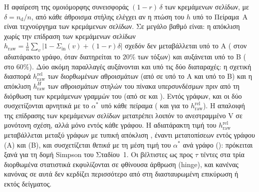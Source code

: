 \documentclass[11pt,a4paper]{article}
\theoremstyle{definition}
\theoremstyle{remark}
\newcommand{\Sin}{\Sigma_{\mathrm{in}}}
\begin{document}
Η αφαίρεση της ομοιόμορφης συνεισφοράς $(1-r)\,\delta$ των κρεμάμενων σελίδων, με
$\delta=n_{\mathrm d}/n$, από κάθε άθροισμα στήλης ελέγχει αν η πτώση του $h$ υπό το Πείραμα~Α είναι τεχνούργημα των
κρεμάμενων σελίδων. Σε μεγάλο βαθμό είναι: η απόκλιση χωρίς την επίδραση των κρεμάμενων σελίδων
$h_{\mathrm{raw}}=\frac1n\sum_v|1-\Sin(v)+(1-r)\delta|$ σχεδόν δεν μεταβάλλεται υπό το Α (\NmHrawFull{}
στον αδιατάρακτο γράφο, \NmHrawSevA{} όταν διατηρείται το $20\%$ των τόξων) και αυξάνεται υπό το Β
(\NmHrawSevB{} στο $60\%$). Δύο ακόμη παραλλαγές αυξάνονται και υπό τις δύο διαταραχές: η σχετική
διασπορά $h_{\mathrm{raw}}^{\mathrm{rel}}$ των διορθωμένων αθροισμάτων (από \NmHrelFull{} σε
\NmHrelSevA{} υπό το Α και \NmHrelSevB{} υπό το Β) και η απόκλιση $h_{\mathrm{raw}}^{H}$ των αθροισμάτων
στηλών του πίνακα υπερσυνδέσμων πριν από τη διόρθωση των κρεμάμενων γραμμών του (από \NmHHFull{} σε
\NmHHSevA{} και \NmHHSevB). Εντός γράφων, και οι δύο συσχετίζονται αρνητικά με το $\alpha^*$ υπό κάθε
πείραμα (\NmHrelAstarA{} και \NmHrelAstarB{} για το $h_{\mathrm{raw}}^{\mathrm{rel}}$). Η απαλοιφή της
επίδρασης των κρεμάμενων σελίδων μετατρέπει λοιπόν το ανεστραμμένο V σε μονότονη σχέση, αλλά μόνο εντός
κάθε γράφου. Η αδιατάρακτη τιμή του $h_{\mathrm{raw}}^{\mathrm{rel}}$ μεταβάλλεται μεταξύ γράφων με
τυπική απόκλιση \NmRelSd, έναντι μετατοπίσεων εντός γράφου \NmRelExcA{} (Α) και \NmRelExcB{} (Β), και
συσχετίζεται \emph{θετικά} με τη μέση τιμή του $\alpha^*$ ανά γράφο (\NmRelBetween): πρόκειται ξανά για
τη δομή Simpson του Σταδίου~1. Οι βέλτιστες ως προς $\tau$ τέντες στα τρία διορθωμένα στατιστικά
εκφυλίζονται σε φθίνουσα άρθρωση (hinge), και κανένας κανόνας σε αυτά δεν κερδίζει περισσότερο από
\NmRawMaxCV{} στη διασταυρωμένη επικύρωση ή \NmRawMaxHeld{} εκτός δείγματος.
\end{document}
